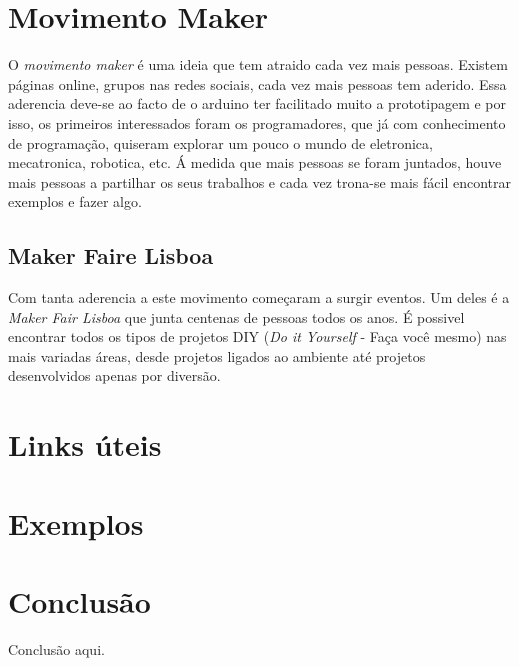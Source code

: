 \documentclass{article}
\begin{document}
\section{Movimento Maker}
O \textit{movimento maker} é uma ideia que tem atraido cada vez mais pessoas. Existem páginas online, grupos nas redes sociais, cada vez mais pessoas tem aderido. Essa aderencia deve-se ao facto de o arduino ter facilitado muito a prototipagem e por isso, os primeiros interessados foram os programadores, que já com conhecimento de programação, quiseram explorar um pouco o mundo de eletronica, mecatronica, robotica, etc.\newline
Á medida que mais pessoas se foram juntados, houve mais pessoas a partilhar os seus trabalhos e cada vez trona-se mais fácil encontrar exemplos e fazer algo.

\subsection{Maker Faire Lisboa}
Com tanta aderencia a este movimento começaram a surgir eventos. Um deles é a \textit{Maker Fair Lisboa} que junta centenas de pessoas todos os anos. É possivel encontrar todos os tipos de projetos DIY (\textit{Do it Yourself} - Faça você mesmo) nas mais variadas áreas, desde projetos ligados ao ambiente até projetos desenvolvidos apenas por diversão.

\section{Links úteis}

\section{Exemplos}

\section{Conclusão}
Conclusão aqui.
\end{document}
